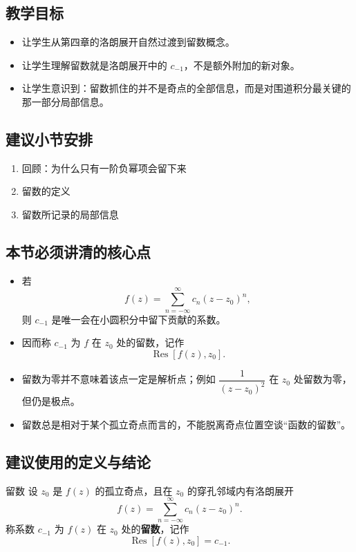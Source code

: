\subsection*{教学目标}
\begin{itemize}
    \item 让学生从第四章的洛朗展开自然过渡到留数概念。
    \item 让学生理解留数就是洛朗展开中的 $c_{-1}$，不是额外附加的新对象。
    \item 让学生意识到：留数抓住的并不是奇点的全部信息，而是对围道积分最关键的那一部分局部信息。
\end{itemize}

\subsection*{建议小节安排}
\begin{enumerate}
    \item 回顾：为什么只有一阶负幂项会留下来
    \item 留数的定义
    \item 留数所记录的局部信息
\end{enumerate}

\subsection*{本节必须讲清的核心点}
\begin{itemize}
    \item 若
    \[
        f(z)=\sum_{n=-\infty}^{\infty} c_n (z-z_0)^n,
    \]
    则 $c_{-1}$ 是唯一会在小圆积分中留下贡献的系数。
    \item 因而称 $c_{-1}$ 为 $f$ 在 $z_0$ 处的留数，记作
    \[
        \operatorname{Res}[f(z),z_0].
    \]
    \item 留数为零并不意味着该点一定是解析点；例如 $\dfrac{1}{(z-z_0)^2}$ 在 $z_0$ 处留数为零，但仍是极点。
    \item 留数总是相对于某个孤立奇点而言的，不能脱离奇点位置空谈``函数的留数''。
\end{itemize}

\subsection*{建议使用的定义与结论}
\begin{dingliyi}{留数}{}
设 $z_0$ 是 $f(z)$ 的孤立奇点，且在 $z_0$ 的穿孔邻域内有洛朗展开
\[
    f(z)=\sum_{n=-\infty}^{\infty} c_n (z-z_0)^n.
\]
称系数 $c_{-1}$ 为 $f(z)$ 在 $z_0$ 处的\textbf{留数}，记作
\[
    \operatorname{Res}[f(z),z_0]=c_{-1}.
\]
\end{dingliyi}

